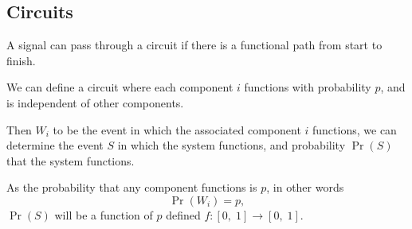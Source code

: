 \documentclass{article}
\begin{document}
\subsection{Circuits}
A signal can pass through a circuit if there is a functional path from start to finish.

We can define a circuit where each component \(i\) functions with probability \(p\),
and is independent of other components.

Then \(W_i\) to be the event in which the associated component \(i\) functions, we can
determine the event \(S\) in which the system functions,
and probability \(\Pr{\left( S \right)}\) that the system functions.

As the probability that any component functions is \(p\), in other words
\begin{equation*}
    \Pr{\left( W_i \right)} = p,
\end{equation*}
\(\Pr{\left( S \right)}\) will be a function of \(p\) defined \(f:\left[ 0,\; 1 \right] \to \left[ 0,\; 1 \right]\).
\end{document}
